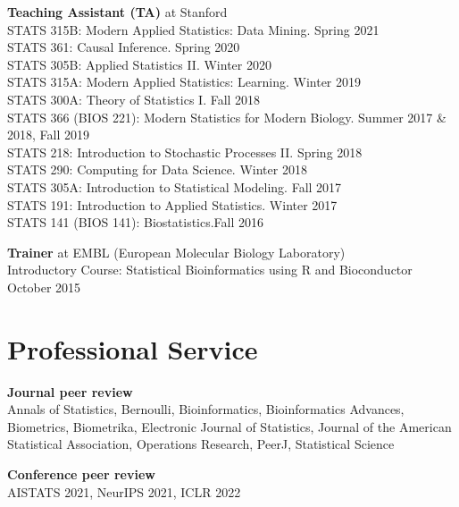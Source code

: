 \documentclass[margin,line]{res}
\newcommand{\ver}{\vspace*{-2.7mm}}
\begin{document}
\begin{resume}
\ver
\textbf{Teaching Assistant (TA)} at Stanford\\
STATS 315B: Modern Applied Statistics: Data Mining. \hfill Spring 2021\\ 
STATS 361: Causal Inference. \hfill Spring 2020\\
STATS 305B: Applied Statistics II. \hfill Winter 2020\\
STATS 315A: Modern Applied Statistics: Learning. \hfill Winter 2019\\
STATS 300A: Theory of Statistics I. \hfill Fall 2018\\
STATS 366 (BIOS 221): Modern Statistics for Modern Biology. \hfill Summer 2017 \& 2018, Fall 2019\\
STATS 218: Introduction to Stochastic Processes II. \hfill Spring 2018\\
STATS 290: Computing for Data Science. \hfill Winter 2018\\
STATS 305A: Introduction to Statistical Modeling. \hfill Fall 2017\\
STATS 191: Introduction to Applied Statistics. \hfill Winter 2017\\
STATS 141 (BIOS 141): Biostatistics.\hfill Fall 2016

\ver
\textbf{Trainer} at EMBL (European Molecular Biology Laboratory)\\
Introductory Course: Statistical Bioinformatics using R and Bioconductor \hfill October 2015




\section{\sc Professional Service}

\textbf{Journal peer review}\\
Annals of Statistics, Bernoulli, Bioinformatics, Bioinformatics Advances, Biometrics, Biometrika, Electronic Journal of Statistics, Journal of the American Statistical Association, Operations Research, PeerJ, Statistical Science

\ver
\textbf{Conference peer review}\\
AISTATS 2021, NeurIPS 2021, ICLR 2022








\end{resume}
\end{document}
